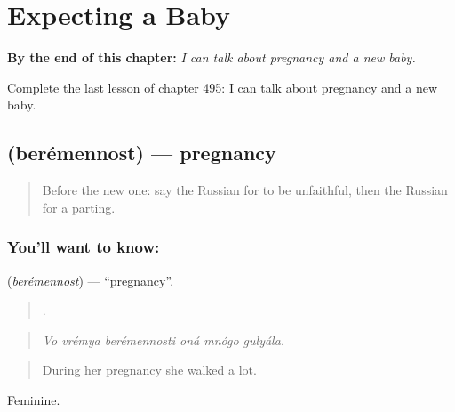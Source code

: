 
\chapter{Expecting a Baby}
\label{ch:ru-expecting-a-baby}

\begin{chapteropening}
\textbf{By the end of this chapter:} \emph{I can talk about pregnancy and a new baby.}

Complete the last lesson of chapter 495: I can talk about pregnancy and a new baby.
\end{chapteropening}

\section[\texorpdfstring{\ru{беременность} (berémennost)}{беременность (berémennost)}]{ (berémennost) — pregnancy}

\label{lesson:RU-C495-beremennost}



\begin{quote}
Before the new one: say the Russian for to be unfaithful, then the Russian for a parting.
\end{quote}

\subsection*{You'll want to know: }
\textbf{} (\emph{berémennost}) — \textquotedblleft{}pregnancy\textquotedblright{}.

\begin{quote}
     .
\end{quote}

\begin{quote}
\emph{Vo vrémya berémennosti oná mnógo gulyála.}
\end{quote}

\begin{quote}
During her pregnancy she walked a lot.
\end{quote}

Feminine.

